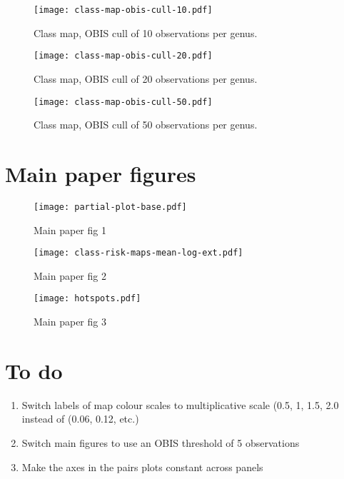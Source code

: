 \documentclass[11pt]{article}
\begin{document}
\begin{figure}[htbp]
\begin{center}
  \texttt{[image: class-map-obis-cull-10.pdf]}
\caption{Class map, OBIS cull of 10 observations per genus.}
\label{fig:class-map-obis-cull-10}
\end{center}
\end{figure}

\begin{figure}[htbp]
\begin{center}
  \texttt{[image: class-map-obis-cull-20.pdf]}
\caption{Class map, OBIS cull of 20 observations per genus.}
\label{fig:class-map-obis-cull-20}
\end{center}
\end{figure}

\begin{figure}[htbp]
\begin{center}
  \texttt{[image: class-map-obis-cull-50.pdf]}
\caption{Class map, OBIS cull of 50 observations per genus.}
\label{fig:class-map-obis-cull-50}
\end{center}
\end{figure}

\clearpage

\section{Main paper figures}

\begin{figure}[htbp]
\begin{center}
\texttt{[image: partial-plot-base.pdf]}
\caption{Main paper fig 1}
\label{fig:1}
\end{center}
\end{figure}

\begin{figure}[htbp]
\begin{center}
\texttt{[image: class-risk-maps-mean-log-ext.pdf]}
\caption{Main paper fig 2}
\label{fig:2}
\end{center}
\end{figure}

\begin{figure}[htbp]
\begin{center}
\texttt{[image: hotspots.pdf]}
\caption{Main paper fig 3}
\label{fig:3}
\end{center}
\end{figure}

\clearpage
\section{To do}
\begin{enumerate}

\item  Switch labels of map colour scales to multiplicative scale (0.5, 1, 1.5, 2.0 instead of (0.06, 0.12, etc.)
\item Switch main figures to use an OBIS threshold of 5 observations
\item Make the axes in the pairs plots constant across panels

\end{enumerate}
\end{document}
